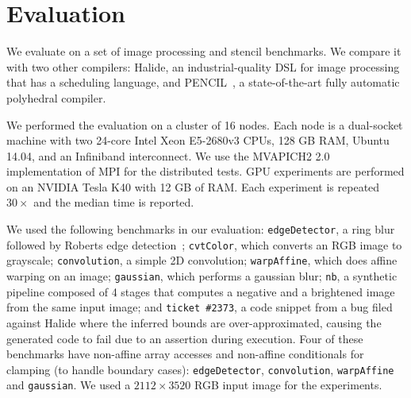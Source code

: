 \vspace{-0.25cm}
\section{Evaluation}

We evaluate \framework{} on a set of image processing and stencil benchmarks.  We compare it with two other compilers: Halide\cite{halide_12}, 
an industrial-quality DSL for image processing that has a scheduling language, and PENCIL~\cite{pencil_paper}, a state-of-the-art fully automatic polyhedral compiler.

We performed the evaluation on a cluster of 16 nodes. Each node is a dual-socket machine with two 24-core Intel Xeon E5-2680v3 CPUs, 128 GB RAM, Ubuntu 14.04, and an Infiniband interconnect.  We use the MVAPICH2 2.0 \cite{mvapich2} implementation of MPI for the distributed tests.
GPU experiments are performed on an NVIDIA Tesla K40 with 12 GB of RAM.  Each experiment is repeated $30\times$ and the median time is reported.

We used the following benchmarks in our evaluation: \texttt{edgeDetector}, a ring blur followed by Roberts edge detection~\cite{roberts65}; \texttt{cvtColor}, which converts an RGB image to grayscale; \texttt{convolution}, a simple 2D convolution; \texttt{warpAffine}, which does affine warping on an image;  \texttt{gaussian}, which performs a gaussian blur; \texttt{nb}, a synthetic pipeline composed of 4 stages that computes a negative and a brightened image from the same input image; and \texttt{ticket \#2373}, a code snippet from a bug filed against Halide where the inferred bounds are over-approximated, causing the generated code to fail due to an assertion during execution.
Four of these benchmarks have non-affine array accesses and non-affine conditionals for clamping (to handle boundary cases): \texttt{edgeDetector}, \texttt{convolution}, \texttt{warpAffine} and \texttt{gaussian}.
We used a $2112\times3520$ RGB input image for the experiments.


